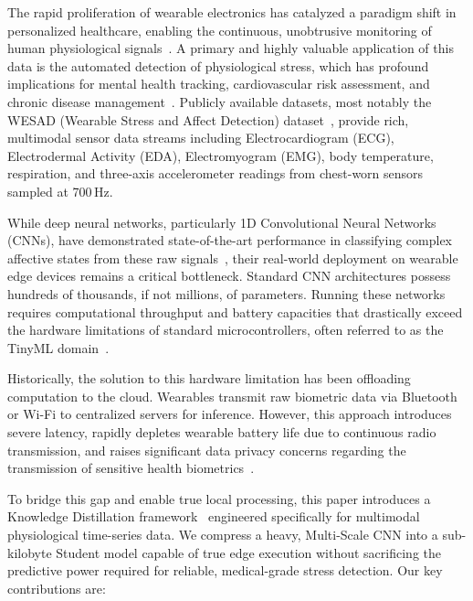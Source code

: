 \documentclass[conference]{IEEEtran}
\begin{document}
The rapid proliferation of wearable electronics has catalyzed a paradigm shift in personalized healthcare, enabling the continuous, unobtrusive monitoring of human physiological signals~\cite{gedam2021review, taskasaplidis2024review}. A primary and highly valuable application of this data is the automated detection of physiological stress, which has profound implications for mental health tracking, cardiovascular risk assessment, and chronic disease management~\cite{kyrou2024deep}. Publicly available datasets, most notably the WESAD (Wearable Stress and Affect Detection) dataset~\cite{schmidt2018introducing}, provide rich, multimodal sensor data streams including Electrocardiogram (ECG), Electrodermal Activity (EDA), Electromyogram (EMG), body temperature, respiration, and three-axis accelerometer readings from chest-worn sensors sampled at 700\,Hz.

While deep neural networks, particularly 1D Convolutional Neural Networks (CNNs), have demonstrated state-of-the-art performance in classifying complex affective states from these raw signals~\cite{li2020stress, benita2024stress, xiang2025multi}, their real-world deployment on wearable edge devices remains a critical bottleneck. Standard CNN architectures possess hundreds of thousands, if not millions, of parameters. Running these networks requires computational throughput and battery capacities that drastically exceed the hardware limitations of standard microcontrollers, often referred to as the TinyML domain~\cite{abadade2023comprehensive, heydari2025tiny}.

Historically, the solution to this hardware limitation has been offloading computation to the cloud. Wearables transmit raw biometric data via Bluetooth or Wi-Fi to centralized servers for inference. However, this approach introduces severe latency, rapidly depletes wearable battery life due to continuous radio transmission, and raises significant data privacy concerns regarding the transmission of sensitive health biometrics~\cite{rashid2023stress}.

To bridge this gap and enable true local processing, this paper introduces a Knowledge Distillation framework~\cite{hinton2015distilling} engineered specifically for multimodal physiological time-series data. We compress a heavy, Multi-Scale CNN into a sub-kilobyte Student model capable of true edge execution without sacrificing the predictive power required for reliable, medical-grade stress detection. Our key contributions are:
\end{document}
